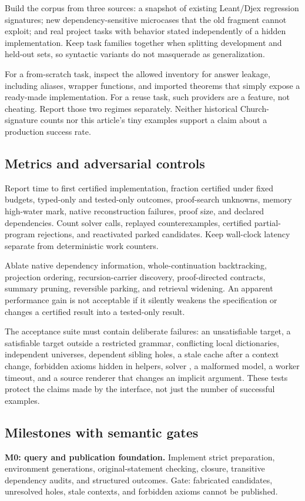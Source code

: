 Build the corpus from three sources: a snapshot of existing Leant/Djex regression signatures; new dependency-sensitive microcases that the old fragment cannot exploit; and real project tasks with behavior stated independently of a hidden implementation. Keep task families together when splitting development and held-out sets, so syntactic variants do not masquerade as generalization.

For a from-scratch task, inspect the allowed inventory for answer leakage, including aliases, wrapper functions, and imported theorems that simply expose a ready-made implementation. For a reuse task, such providers are a feature, not cheating. Report those two regimes separately. Neither historical Church-signature counts nor this article's tiny examples support a claim about a production success rate.

\subsection{Metrics and adversarial controls}
Report time to first certified implementation, fraction certified under fixed budgets, typed-only and tested-only outcomes, proof-search unknowns, memory high-water mark, native reconstruction failures, proof size, and declared dependencies. Count solver calls, replayed counterexamples, certified partial-program rejections, and reactivated parked candidates. Keep wall-clock latency separate from deterministic work counters.

Ablate native dependency information, whole-continuation backtracking, projection ordering, recursion-carrier discovery, proof-directed contracts, summary pruning, reversible parking, and retrieval widening. An apparent performance gain is not acceptable if it silently weakens the specification or changes a certified result into a tested-only result.

The acceptance suite must contain deliberate failures: an unsatisfiable target, a satisfiable target outside a restricted grammar, conflicting local dictionaries, independent universes, dependent sibling holes, a stale cache after a context change, forbidden axioms hidden in helpers, solver , a malformed model, a worker timeout, and a source renderer that changes an implicit argument. These tests protect the claims made by the interface, not just the number of successful examples.

\subsection{Milestones with semantic gates}
\textbf{M0: query and publication foundation.} Implement strict preparation, environment generations, original-statement checking, closure, transitive dependency audits, and structured outcomes. Gate: fabricated candidates, unresolved holes, stale contexts, and forbidden axioms cannot be published.

